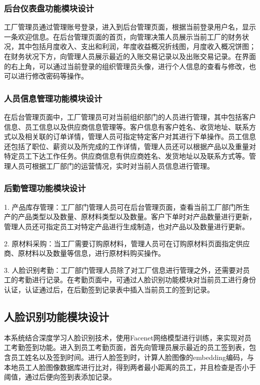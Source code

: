 \subsubsection{后台仪表盘功能模块设计}

工厂管理员通过管理账号登录，进入到后台管理页面，根据当前登录用户名，显示一条欢迎信息。在后台管理页面的首页，向管理决策人员展示当前工厂的财务状况，其中包括月度收入、支出和利润，年度收益概况折线图，月度收入概况饼图；在财务状况下方，向管理人员展示最近的入账交易记录以及出账交易记录。在界面的右上角，可以通过当前登录的组织管理员头像，进行个人信息的查看与修改，也可以进行修改密码等操作。

\subsubsection{人员信息管理功能模块设计}

在后台管理页面中，工厂管理员可对当前组织部门的人员进行管理，其中包括客户信息、员工信息以及供应商信息管理等。客户信息有客户姓名、收货地址、联系方式以及相关联的订单详情，管理人员可指定特定客户对其进行下单操作。员工信息还包括了职位、薪资以及所完成的工作详情，管理人员还可以根据产品以及重量对特定员工下达工作任务。供应商信息有供应商姓名、发货地址以及联系方式等。管理人员可根据工厂部门的运营情况，实时对当前人员信息进行管理。

\subsubsection{后勤管理功能模块设计}

1. 产品库存管理：工厂部门管理人员可在后台管理页面，查看当前工厂部门所生产的产品类型以及数量、原材料类型以及数量。客户下单时对产品数量进行更新，管理人员还可指定员工对特定产品进行生成制造，也对产品以及数量进行更新。

2. 原材料采购：当工厂需要订购原材料，管理人员可在订购原材料页面指定供应商、原材料以及数量等信息，进行原材料购买操作。

3. 人脸识别考勤：工厂部门管理人员除了对工厂信息进行管理之外，还需要对员工的考勤进行记录。在考勤页面中，可通过人脸识别功能模块对当前员工进行身份认证，认证通过后，在后勤签到记录表中插入当前员工的签到记录。

\subsection{人脸识别功能模块设计}

本系统结合深度学习人脸识别技术，使用Facenet网络模型进行训练，来实现对员工考勤签到功能。进入到员工考勤页面，首先向管理员展示最近的员工签到表，包含员工姓名以及签到时间。进行人脸签到时，计算人脸图像的embedding编码，与本地员工人脸图像数据库进行比对，得到两者最小距离的员工，并且检查是否小于阈值，通过后便向签到表添加记录。

